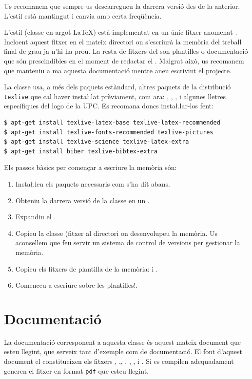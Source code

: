 \documentclass{tfgitic}
\begin{document}
Us recomanem que sempre us descarregueu la darrera versió des de la
 anterior. L'estil està mantingut i canvia amb certa
freqüència.

L'estil (classe en argot \LaTeX{}) està implementat en un únic fitxer
anomenat . Incloent aquest fitxer en el mateix
directori on s'escriurà la memòria del treball final de grau ja n'hi
ha prou. La resta de fitxers del  son plantilles o
documentació que són prescindibles en el moment de redactar el
. Malgrat això, us recomanem que manteniu a ma aquesta
documentació mentre aneu escrivint el projecte.

La classe usa, a més dels paquets estàndard, altres paquets de la
distribució \texttt{texlive} que cal haver insta\l.lat prèviament, com
ara: , , ,
 i algunes lletres específiques del logo de la UPC. Es
recomana doncs insta\l.lar-los fent:
\begin{verbatim}
$ apt-get install texlive-latex-base texlive-latex-recommended
$ apt-get install texlive-fonts-recommended texlive-pictures
$ apt-get install texlive-science texlive-latex-extra
$ apt-get install biber texlive-bibtex-extra
\end{verbatim}

Els passos bàsics per començar a escriure la memòria són:
\begin{enumerate}
\item Insta\l.leu els paquets necessaris com s'ha dit abans.
\item Obteniu la darrera versió de la classe en un 
  .
\item Expandiu el .
\item Copieu la classe (fitxer  al directori on
  desenvolupeu la memòria. Us aconsellem que feu servir un sistema de
  control de versions per gestionar la memòria.
\item Copieu els fitxers de plantilla de la memòria:  i
  .
\item Comenceu a escriure sobre les plantilles!.
\end{enumerate}

\section{Documentació}
\label{sec:documentacio}

La documentació corresponent a aquesta classe és aquest mateix
document que esteu llegint, que serveix tant d'exemple com de
documentació. El font d'aquest document el constitueixen els fitxers
, ,,
, ,
,  i
. Si es compilen adequadament generen el fitxer en
format \texttt{pdf} que esteu llegint.
\end{document}
